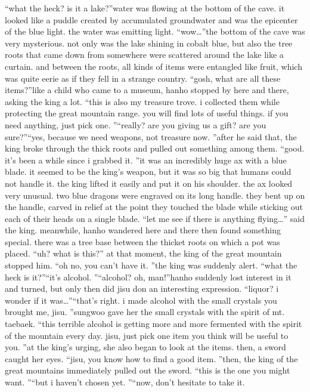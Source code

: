 “what the heck? is it a lake?”water was flowing at the bottom of the cave.
 it looked like a puddle created by accumulated groundwater and was the epicenter of the blue light.
 the water was emitting light.
“wow…”the bottom of the cave was very mysterious.
 not only was the lake shining in cobalt blue, but also the tree roots that came down from somewhere were scattered around the lake like a curtain.
 and between the roots, all kinds of items were entangled like fruit, which was quite eerie as if they fell in a strange country.
“gosh, what are all these items?”like a child who came to a museum, hanho stopped by here and there, asking the king a lot.
“this is also my treasure trove.
 i collected them while protecting the great mountain range.
 you will find lots of useful things.
 if you need anything, just pick one.
”“really? are you giving us a gift? are you sure?”“yes, because we need weapons, not treasure now.
”after he said that, the king broke through the thick roots and pulled out something among them.
“good.
 it’s been a while since i grabbed it.
”it was an incredibly huge ax with a blue blade.
 it seemed to be the king’s weapon, but it was so big that humans could not handle it.
 the king lifted it easily and put it on his shoulder.
the ax looked very unusual.
 two blue dragons were engraved on its long handle.
 they bent up on the handle, carved in relief at the point they touched the blade while sticking out each of their heads on a single blade.
“let me see if there is anything flying…” said the king.
meanwhile, hanho wandered here and there then found something special.
there was a tree base between the thicket roots on which a pot was placed.
“uh? what is this?”
at that moment, the king of the great mountain stopped him.
“oh no, you can’t have it.
”the king was suddenly alert.
“what the heck is it?”“it’s alcohol.
”“alcohol? oh, man!”hanho suddenly lost interest in it and turned, but only then did jisu don an interesting expression.
“liquor? i wonder if it was…”“that’s right.
 i made alcohol with the small crystals you brought me, jisu.
”sungwoo gave her the small crystals with the spirit of mt.
 taebaek.
“this terrible alcohol is getting more and more fermented with the spirit of the mountain every day.
 jisu, just pick one item you think will be useful to you.
”at the king’s urging, she also began to look at the items.
 then, a sword caught her eyes.
“jisu, you know how to find a good item.
”then, the king of the great mountains immediately pulled out the sword.
“this is the one you might want.
”“but i haven’t chosen yet.
”“now, don’t hesitate to take it.
